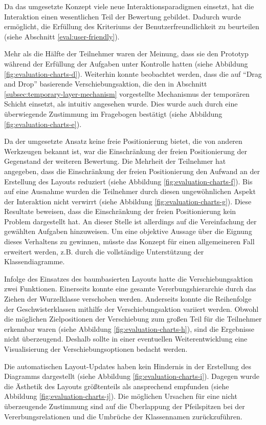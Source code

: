 Da das umgesetzte Konzept viele neue Interaktionsparadigmen einsetzt, hat die Interaktion einen wesentlichen Teil der Bewertung gebildet. Dadurch wurde ermöglicht, die Erfüllung des Kriteriums der Benutzerfreundlichkeit zu beurteilen (siehe Abschnitt \ref{eval:user-friendly}).

Mehr als die Hälfte der Teilnehmer waren der Meinung, dass sie den Prototyp während der Erfüllung der Aufgaben unter Kontrolle hatten (siehe Abbildung \ref{fig:evaluation-charts-d}). Weiterhin konnte beobachtet werden, dass die auf \enquote{Drag and Drop} basierende Verschiebungsaktion, die den in Abschnitt \ref{subsec:temporary-layer-mechanism} vorgestellte Mechanismus der temporären Schicht einsetzt, als intuitiv angesehen wurde. Dies wurde auch durch eine überwiegende Zustimmung im Fragebogen bestätigt (siehe Abbildung \ref{fig:evaluation-charts-e}).

Da der umgesetzte Ansatz keine freie Positionierung bietet, die von anderen Werkzeugen bekannt ist, war die Einschränkung der freien Positionierung der Gegenstand der weiteren Bewertung. Die Mehrheit der Teilnehmer hat angegeben, dass die Einschränkung der freien Positionierung den Aufwand an der Erstellung des Layouts reduziert (siehe Abbildung \ref{fig:evaluation-charts-f}). Bis auf eine Ausnahme wurden die Teilnehmer durch diesen ungewöhnlichen Aspekt der Interaktion nicht verwirrt (siehe Abbildung \ref{fig:evaluation-charts-g}). Diese Resultate beweisen, dass die Einschränkung der freien Positionierung kein Problem dargestellt hat. An dieser Stelle ist allerdings auf die Vereinfachung der gewählten Aufgaben hinzuweisen. Um eine objektive Aussage über die Eignung dieses Verhaltens zu gewinnen, müsste das Konzept für einen allgemeineren Fall erweitert werden, z.B. durch die vollständige Unterstützung der Klassendiagramme.

Infolge des Einsatzes des baumbasierten Layouts hatte die Verschiebungsaktion zwei Funktionen. Einerseits konnte eine gesamte Vererbungshierarchie durch das Ziehen der Wurzelklasse verschoben werden. Anderseits konnte die Reihenfolge der Geschwisterklassen mithilfe der Verschiebungsaktion variiert werden. Obwohl die möglichen Zielpositionen der Verschiebung zum großen Teil für die Teilnehmer erkennbar waren (siehe Abbildung \ref{fig:evaluation-charts-h}), sind die Ergebnisse nicht überzeugend. Deshalb sollte in einer eventuellen Weiterentwicklung eine Visualisierung der Verschiebungsoptionen bedacht werden.

Die automatischen Layout-Updates haben kein Hindernis in der Erstellung des Diagramms dargestellt (siehe Abbildung \ref{fig:evaluation-charts-i}). Dagegen wurde die Ästhetik des Layouts größtenteils als ansprechend empfunden (siehe Abbildung \ref{fig:evaluation-charts-j}). Die möglichen Ursachen für eine nicht überzeugende Zustimmung sind auf die Überlappung der Pfeilspitzen bei der Vererbungsrelationen und die Umbrüche der Klassennamen zurückzuführen.

